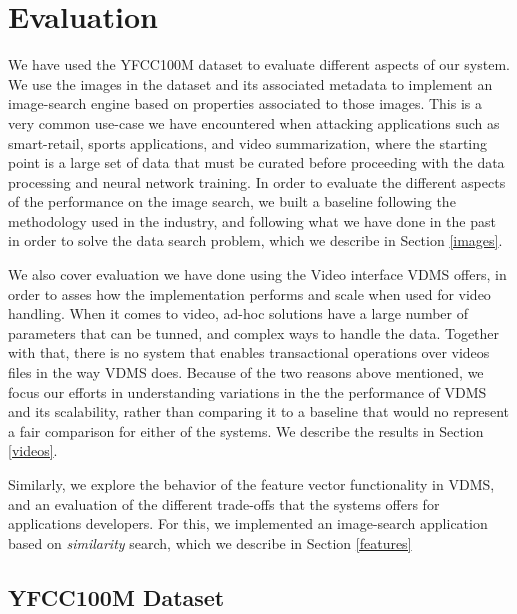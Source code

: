 \section{Evaluation}
\label{eval}

We have used the YFCC100M dataset to evaluate different aspects of our system.
We use the images in the dataset and its associated metadata to implement
an image-search engine based on properties associated to those images.
This is a very common use-case we have encountered when attacking
applications such as smart-retail, sports applications, and video summarization,
where the starting point is a large set of data that must be curated
before proceeding with the data processing and neural network training.
In order to evaluate the different aspects of the performance on the
image search, we built a baseline following the methodology used in the industry, and following what we have done in the past in order to solve
the data search problem, which we describe in Section \ref{images}.

We also cover evaluation we have done using the Video interface VDMS offers,
in order to asses how the implementation performs and scale when used
for video handling.
When it comes to video, ad-hoc solutions have a large number of parameters that
can be tunned, and complex ways to handle the data. Together with that,
there is no system that enables transactional operations over videos files
in the way VDMS does. Because of the two reasons above mentioned,
we focus our efforts in understanding variations in the the performance of
VDMS and its scalability, rather than comparing it to a baseline that
would no represent a fair comparison for either of the systems.
We describe the results in Section \ref{videos}.

Similarly, we explore the behavior of the feature vector functionality in VDMS,
and an evaluation of the different trade-offs that the systems offers for
applications developers. For this, we implemented an image-search application
based on \textit{similarity} search, which we describe in Section \ref{features}


\subsection{YFCC100M Dataset}
\label{dataset}


